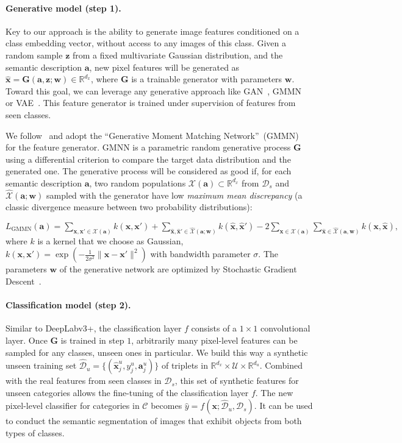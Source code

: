 \documentclass{article}
\newcommand{\mbf}[1]{\ensuremath{\mathbf{#1}}}
\newcommand{\mc}[1]{\ensuremath{\mathcal{#1}}}
\newcommand{\bx}{\mbf{x}}
\newcommand{\ba}{\mbf{a}}
\newcommand{\bw}{\mbf{w}}
\newcommand{\bz}{\mbf{z}}
\newcommand{\cC}{\mc{C}}
\newcommand{\cU}{\mc{U}}
\newcommand{\cD}{\mc{D}}
\newcommand{\cX}{\mc{X}}
\begin{document}
\vspace{-0.3cm}
\paragraph{Generative model (step 1).}
Key to our approach is the ability to generate image features conditioned on a class embedding vector, without access to any images of this class.
Given a random sample $\bz$ from a fixed multivariate Gaussian distribution, and the semantic description $\ba$, new pixel features will be generated as $\widehat{\bx} = \mathbf{G}(\ba, \bz;\bw)\in\mathbb{R}^{d_x}$, where $\mathbf{G}$ is a trainable generator with parameters $\bw$.
Toward this goal, we can leverage any generative approach like GAN~\cite{goodfellow2014generative}, GMMN~\cite{li2015generative} or VAE~\cite{kingma2013auto}. This feature generator is trained under supervision of features from seen classes.


We follow~\cite{bucher2017generating} and adopt the ``Generative Moment Matching Network''~(GMMN)~\cite{li2015generative} for the feature generator.
GMNN is a parametric random generative process $\mathbf{G}$ using a differential criterion to compare the target data distribution and the generated one.
The generative process will be considered as good if, for each semantic description $\mathbf{a}$, two random populations $\mathcal{X}(\mathbf{a})\subset \mathbb{R}^{d_x}$ from $\mathcal{D}_s$ and $\widehat{\mathcal{X}}(\mathbf{a};\mathbf{w})$ sampled with the generator have low \emph{maximum mean discrepancy} (a classic divergence measure between two probability distributions):

$ L_{\text{GMMN}}(\mathbf{a}) =\sum_{\bx,\bx'\in\cX(\ba)} k(\bx,\bx')
 +\sum_{\widehat{\bx},\widehat{\bx}'\in\widehat{\cX}(\ba;\bw) } k(\widehat{\bx},\widehat{\bx}')
 - 2 \sum_{\bx\in\cX(\ba)} \sum_{\widehat{\bx}\in\widehat{\cX}(\ba,\bw)} k(\bx,\widehat{\bx}),
$
where $k$ is a kernel that we choose as Gaussian, $k(\bx, \bx') = \exp(-\frac{1}{2\sigma^2} \|\bx-\bx' \|^{2})$ with bandwidth parameter $\sigma$.
The parameters $\mathbf{w}$ of the generative network are optimized by Stochastic Gradient Descent~\cite{bottou2010large}.


\vspace{-0.3cm}
\paragraph{Classification model (step 2).}
Similar to DeepLabv3+, the classification layer $f$ consists of a $1\times1$ convolutional layer.
Once $\mathbf{G}$ is trained in step $1$, arbitrarily many pixel-level features can be sampled for any classes, unseen ones in particular.
We build this way a synthetic unseen training set $\widehat{\cD}_u = \{(\widehat{\bx}_j^u,y_j^u,\ba_j^u)\}$ of triplets in $\mathbb{R}^{d_x} \times \cU \times \mathbb{R}^{d_a}$.
Combined with the real features from seen classes in $\cD_s$, this set of synthetic features for unseen categories allows the fine-tuning of the classification layer $f$.
The new pixel-level classifier for categories in $\cC$ becomes $\widehat{y} = f(\bx; \widehat{\mathcal{D}}_u, \mathcal{D}_s)$. 
It can be used to conduct the semantic segmentation of images that exhibit objects from both types of classes. 
\end{document}
